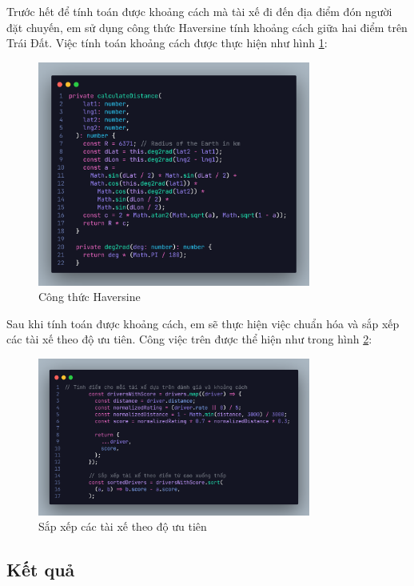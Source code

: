 \documentclass[../DoAn.tex]{subfiles}
\begin{document}
Trước hết để tính toán được khoảng cách mà tài xế đi đến địa điểm đón người đặt chuyến, em sử dụng công thức Haversine tính khoảng cách giữa hai điểm trên Trái Đất.
Việc tính toán khoảng cách được thực hiện như hình \ref{fig:Cong_thuc_Haversine}:
\begin{figure}[H]
  \centering
  \includegraphics[width=0.8\textwidth]{Hinhve/Cong_thuc_Haversine.png}
  \caption{Công thức Haversine}
  \label{fig:Cong_thuc_Haversine}
\end{figure}
Sau khi tính toán được khoảng cách, em sẽ thực hiện việc chuẩn hóa và sắp xếp các tài xế theo độ ưu tiên.
Công việc trên được thể hiện như trong hình \ref{fig:Sap_xep_tai_xe_theo_do_uu_tien}: 
\begin{figure}[H]
  \centering
  \includegraphics[width=0.8\textwidth]{Hinhve/Thu_tu_do_uu_tien.png}
  \caption{Sắp xếp các tài xế theo độ ưu tiên}
  \label{fig:Sap_xep_tai_xe_theo_do_uu_tien}
\end{figure}
\subsection{Kết quả}
\label{subsection:5.2.3}
\end{document}
